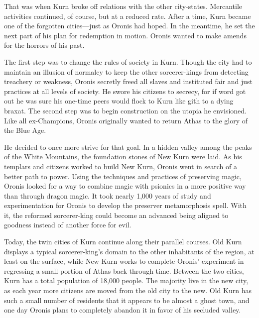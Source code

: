 {	That was when Kurn broke off relations with the other city-states. Mercantile activities continued, of course, but at a reduced rate. After a time, Kurn became one of the forgotten cities---just as Oronis had hoped. In the meantime, he set the next part of his plan for redemption in motion. Oronis wanted to make amends for the horrors of his past.

	The first step was to change the rules of society in Kurn. Though the city had to maintain an illusion of normalcy to keep the other sorcerer-kings from detecting treachery or weakness, Oronis secretly freed all slaves and instituted fair and just practices at all levels of society. He swore his citizens to secrecy, for if word got out he was sure his one-time peers would flock to Kurn like gith to a dying braxat. The second step was to begin construction on the utopia he envisioned. Like all ex-Champions, Oronis originally wanted to return Athas to the glory of the Blue Age.

	He decided to once more strive for that goal. In a hidden valley among the peaks of the White Mountains, the foundation stones of New Kurn were laid. As his templars and citizens worked to build New Kurn, Oronis went in search of a better path to power. Using the techniques and practices of preserving magic, Oronis looked for a way to combine magic with psionics in a more positive way than through dragon magic. It took nearly 1,000 years of study and experimentation for Oronis to develop the preserver metamorphosis spell. With it, the reformed sorcerer-king could become an advanced being aligned to goodness instead of another force for evil.

	Today, the twin cities of Kurn continue along their parallel courses. Old Kurn displays a typical sorcerer-king's domain to the other inhabitants of the region, at least on the surface, while New Kurn works to complete Oronis' experiment in regressing a small portion of Athas back through time. Between the two cities, Kurn has a total population of 18,000 people. The majority live in the new city, as each year more citizens are moved from the old city to the new. Old Kurn has such a small number of residents that it appears to be almost a ghost town, and one day Oronis plans to completely abandon it in favor of his secluded valley.
}
